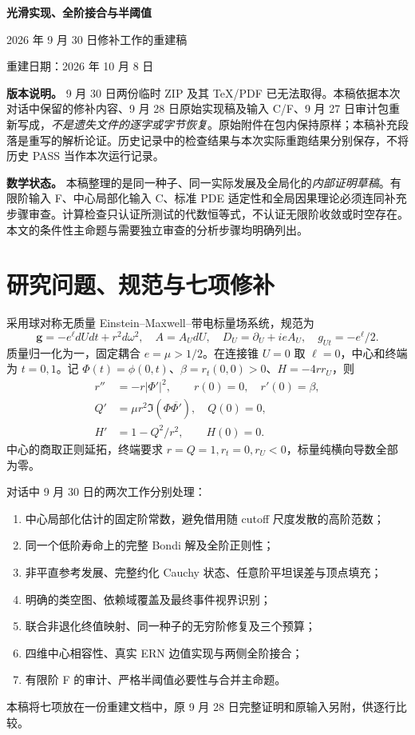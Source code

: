 \begin{center}
{\LARGE\bfseries 光滑实现、全阶接合与半阈值}\par
\vspace{0.6em}
{\large 2026 年 9 月 30 日修补工作的重建稿}\par
重建日期：2026 年 10 月 8 日
\end{center}
\noindent\textbf{版本说明。} 9 月 30 日两份临时 ZIP 及其 TeX/PDF 已无法取得。本稿依据本次对话中保留的修补内容、9 月 28 日原始实现稿及输入 C/F、9 月 27 日审计包重新写成，\emph{不是遗失文件的逐字或字节恢复}。原始附件在包内保持原样；本稿补充段落是重写的解析论证。历史记录中的检查结果与本次实际重跑结果分别保存，不将历史 PASS 当作本次运行记录。

\noindent\textbf{数学状态。} 本稿整理的是同一种子、同一实际发展及全局化的\emph{内部证明草稿}。有限阶输入 F、中心局部化输入 C、标准 PDE 适定性和全局因果理论必须连同补充步骤审查。计算检查只认证所测试的代数恒等式，不认证无限阶收敛或时空存在。本文的条件性主命题与需要独立审查的分析步骤均明确列出。

\tableofcontents

\section{研究问题、规范与七项修补}
采用球对称无质量 Einstein--Maxwell--带电标量场系统，规范为
\[
\mathbf g=-e^\ell dUdt+r^2d\omega^2,\quad A=A_UdU,
\quad D_U=\partial_U+ieA_U,\quad g_{Ut}=-e^\ell/2.
\]
质量归一化为一，固定耦合 $e=\mu>1/2$。在连接锥 $U=0$ 取 $\ell=0$，中心和终端为 $t=0,1$。记 $\Phi(t)=\phi(0,t)$、$\beta=r_t(0,0)>0$、$H=-4rr_U$，则
\begin{equation}\label{eq:cone}
\begin{split}
r''&=-r|\Phi'|^2,\qquad r(0)=0,\quad r'(0)=\beta,\\
Q'&=\mu r^2\Im(\Phi\overline{\Phi'}),\quad Q(0)=0,\\
H'&=1-Q^2/r^2,\qquad H(0)=0.
\end{split}
\end{equation}
中心的商取正则延拓，终端要求 $r=Q=1,r_t=0,r_U<0$，标量纯横向导数全部为零。

对话中 9 月 30 日的两次工作分别处理：
\begin{enumerate}
\item 中心局部化估计的固定阶常数，避免借用随 cutoff 尺度发散的高阶范数；
\item 同一个低阶寿命上的完整 Bondi 解及全阶正则性；
\item 非平直参考发展、完整约化 Cauchy 状态、任意阶平坦误差与顶点填充；
\item 明确的类空图、依赖域覆盖及最终事件视界识别；
\item 联合非退化终值映射、同一种子的无穷阶修复及三个预算；
\item 四维中心相容性、真实 ERN 边值实现与两侧全阶接合；
\item 有限阶 F 的审计、严格半阈值必要性与合并主命题。
\end{enumerate}
本稿将七项放在一份重建文档中，原 9 月 28 日完整证明和原输入另附，供逐行比较。

